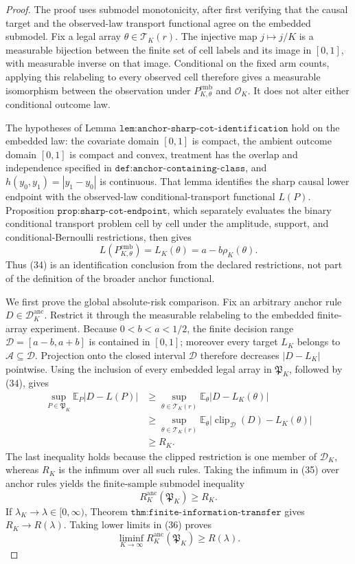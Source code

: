\documentclass{article}
\begin{document}
\begin{proof}
The proof uses submodel monotonicity, after first verifying that the causal
target and the observed-law transport functional agree on the embedded
submodel.  Fix a legal array \(\theta\in\mathcal T_K(r)\).  The injective
map \(j\mapsto j/K\) is a measurable bijection between the finite set of
cell labels and its image in \([0,1]\), with measurable inverse on that
image.  Conditional on the fixed arm counts, applying this relabeling to
every observed cell therefore gives a measurable isomorphism between the
observation under \(P_{K,\theta}^{\mathrm{emb}}\) and \(\mathcal O_K\).
It does not alter either conditional outcome law.

The hypotheses of Lemma
\(\texttt{lem:anchor-sharp-cot-identification}\) hold on the embedded
law: the covariate domain \([0,1]\) is compact, the ambient outcome domain
\([0,1]\) is compact and convex, treatment has the overlap and
independence specified in \(\texttt{def:anchor-containing-class}\), and
\(h(y_0,y_1)=|y_1-y_0|\) is continuous.  That lemma identifies the sharp
causal lower endpoint with the observed-law conditional-transport
functional \(L(P)\).  Proposition
\(\texttt{prop:sharp-cot-endpoint}\), which separately evaluates the
binary conditional transport problem cell by cell under the amplitude,
support, and conditional-Bernoulli restrictions, then gives
\[
 L(P_{K,\theta}^{\mathrm{emb}})
 =L_K(\theta)=a-b\rho_K(\theta).
 \tag{34}
\]
Thus (34) is an identification conclusion from the declared restrictions,
not part of the definition of the broader anchor functional.

We first prove the global absolute-risk comparison.  Fix an arbitrary
anchor rule \(D\in\mathscr D_K^{\mathrm{anc}}\).  Restrict it through the
measurable relabeling to the embedded finite-array experiment.  Because
\(0<b<a<1/2\), the finite decision range
\(\mathcal D=[a-b,a+b]\) is contained in \([0,1]\); moreover every target
\(L_K\) belongs to \(\mathcal A\subseteq\mathcal D\).  Projection onto
the closed interval \(\mathcal D\) therefore decreases
\(|D-L_K|\) pointwise.  Using the inclusion of every embedded legal array
in \(\mathfrak P_K\), followed by (34), gives
\[
\begin{aligned}
 \sup_{P\in\mathfrak P_K}\mathbb E_P|D-L(P)|
 &\geq
 \sup_{\theta\in\mathcal T_K(r)}
 \mathbb E_\theta|D-L_K(\theta)|\\
 &\geq
 \sup_{\theta\in\mathcal T_K(r)}
 \mathbb E_\theta
 \bigl|\operatorname{clip}_{\mathcal D}(D)-L_K(\theta)\bigr|\\
 &\geq R_K.
\end{aligned}
 \tag{35}
\]
The last inequality holds because the clipped restriction is one member of
\(\mathscr D_K\), whereas \(R_K\) is the infimum over all such rules.
Taking the infimum in (35) over anchor rules yields the finite-sample
submodel inequality
\[
 R_K^{\mathrm{anc}}(\mathfrak P_K)\geq R_K.
 \tag{36}
\]
If \(\lambda_K\to\lambda\in[0,\infty)\), Theorem
\(\texttt{thm:finite-information-transfer}\) gives
\(R_K\to R(\lambda)\).  Taking lower limits in (36) proves
\[
 \liminf_{K\to\infty}R_K^{\mathrm{anc}}(\mathfrak P_K)
 \geq R(\lambda).
 \tag{37}
\]


\end{proof}
\end{document}

